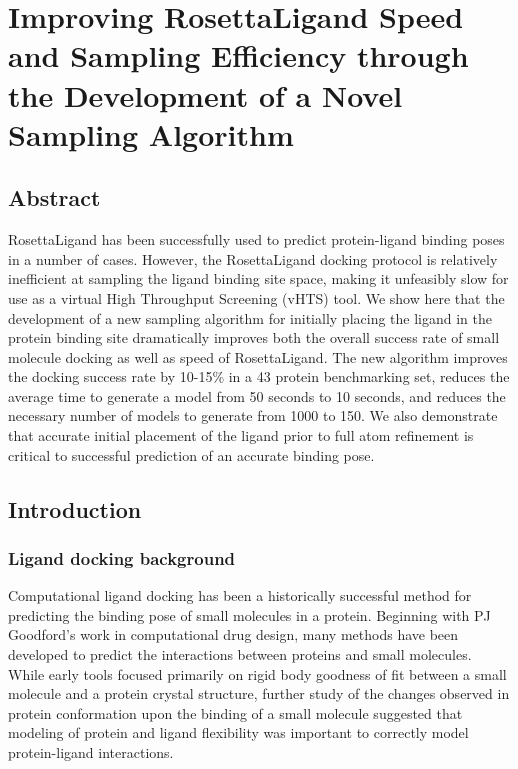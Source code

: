 \chapter{Improving RosettaLigand Speed and Sampling Efficiency through the Development of a Novel Sampling Algorithm}
\label{chap:lowres_paper}
\section{Abstract}

RosettaLigand has been successfully used to predict protein-ligand binding poses in a number of cases\citep{Turlington:2013et,Davis:2009fx,Combs:2013bl}.
However, the RosettaLigand docking protocol is relatively inefficient at sampling the ligand binding site space, making it unfeasibly slow for use as a virtual High Throughput Screening (vHTS) tool.
We show here that the development of a new sampling algorithm for initially placing the ligand in the protein binding site dramatically improves both the overall success rate of small molecule docking as well as speed of RosettaLigand.
The new algorithm improves the docking success rate by 10-15\% in a 43 protein benchmarking set, reduces the average time to generate a model from 50 seconds to 10 seconds, and reduces the necessary number of models to generate from 1000 to 150.
We also demonstrate that accurate initial placement of the ligand prior to full atom refinement is critical to successful prediction of an accurate binding pose.

\section{Introduction}

\subsection{Ligand docking background}

Computational ligand docking has been a historically successful method for predicting the binding pose of small molecules in a protein.
Beginning with PJ Goodford's work in computational drug design\citep{Goodford:1985bf}, many methods have been developed to predict the interactions between proteins and small molecules.
While early tools focused primarily on rigid body goodness of fit between a small molecule and a protein crystal structure, further study of the changes observed in protein conformation upon the binding of a small molecule\citep{Bystroff:1991tl} suggested that modeling of protein and ligand flexibility was important to correctly model protein-ligand interactions.

